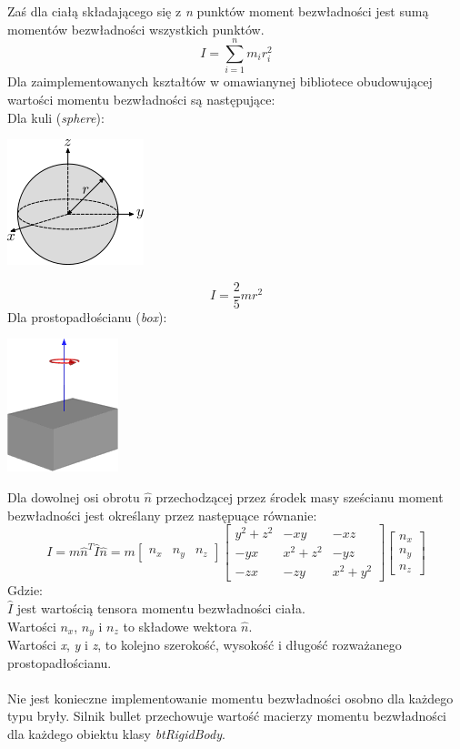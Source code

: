 Zaś dla ciałą składającego się z \emph{n} punktów moment bezwładności jest sumą
momentów bezwładności wszystkich punktów.
\begin{equation}
I = \sum_{i=1}^{n} m_{i}r_{i}^{2}
\end{equation}
Dla zaimplementowanych kształtów w omawianynej bibliotece obudowującej wartości
momentu bezwładności są następujące:\\
Dla kuli (\emph{sphere}):\\
\begin{center}
\includegraphics{./img/inertiaSphere.png}
\end{center}
\begin{equation}
I = \frac{2}{5}mr^{2}
\end{equation}
Dla prostopadłościanu (\emph{box}):\\
\begin{center}
\includegraphics{./img/inertiaBox.png}
\end{center}
Dla dowolnej osi obrotu $ \hat{n} $ przechodzącej przez środek masy sześcianu
moment bezwładności jest określany przez następuące równanie:
\begin{equation}
I = m\hat{n}^{T}\hat{I}\hat{n} = m
\begin{bmatrix}n_{x}&n_{y}&n_{z}\end{bmatrix}
\begin{bmatrix}y^{2}+z^{2}&-xy&-xz\\-yx&x^{2}+z^{2}&-yz\\-zx&-zy&x^{2}+y^{2}\end{bmatrix}
\begin{bmatrix}n_{x}\\n_{y}\\n_{z}\end{bmatrix}
\label{eq:boxInertia}
\end{equation}
Gdzie:\\
$\hat{I}$ jest wartością tensora momentu bezwładności ciała.\\
Wartości $n_{x}$, $n_{y}$ i $n_{z}$ to składowe wektora $\hat{n}$.\\
Wartości \emph{x}, \emph{y} i \emph{z}, to kolejno szerokość, wysokość i długość
rozważanego prostopadłościanu.\\ \\
Nie jest konieczne implementowanie momentu bezwładności osobno dla każdego typu
bryły. Silnik bullet przechowuje wartość macierzy momentu bezwładności dla
każdego obiektu klasy \emph{btRigidBody}.

